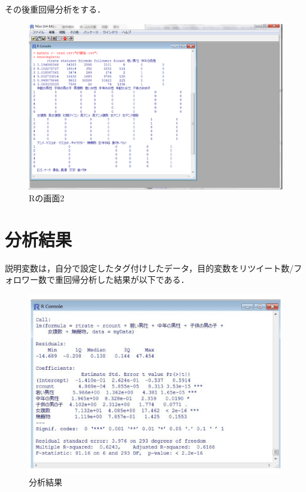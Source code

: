 その後重回帰分析をする．

\begin{figure}[H]
\centering
\includegraphics[width=15cm]{kekka003.png}
\caption{Rの画面2}\label{Rの画面1}
\end{figure}


\section{分析結果}

説明変数は，自分で設定したタグ付けしたデータ，目的変数をリツイート数/フォロワー数で重回帰分析した結果が以下である．

\begin{figure}[H]
\centering
\includegraphics[width=15cm]{kekka004.png}
\caption{分析結果}\label{分析結果}
\end{figure}

